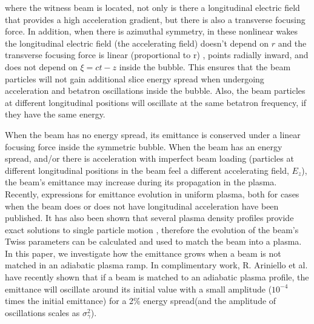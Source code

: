 \documentclass[%
reprint, superscriptaddress,
 amsmath,amssymb, aps,
prstab,
]{revtex4-2}
\begin{document}
where the witness beam is located, not only is there a longitudinal
electric field that provides a high acceleration gradient, but there is also a
transverse focusing force. In addition, when
there is azimuthal symmetry, in these nonlinear wakes the longitudinal electric field (the
accelerating field) doesn't depend on $r$ and the transverse focusing
force is linear (proportional to r) , points radially inward, and does not depend on $\xi = ct- z$ inside the bubble\cite{WeiLu2006}. This ensures
that the beam particles will not gain additional slice energy spread when
undergoing acceleration and betatron oscillations inside the bubble. Also, the beam particles at different
longitudinal positions will oscillate at the same betatron frequency, if
they have the same energy.

When the beam has no energy spread, its emittance is conserved under a
linear focusing force inside the symmetric bubble. When the beam has an energy
spread, %
and/or there is acceleration with imperfect beam loading (particles at different
longitudinal positions in the beam feel a different accelerating field,
$E_z$), the beam's emittance may increase during its propagation in the
plasma. 
Recently, expressions for emittance evolution in uniform plasma, 
both for cases when the beam does \cite{Xinlu2016} or does not have \cite{German2018}
longitudinal acceleration have been published. It has also been shown that several plasma density profiles provide 
exact solutions to single particle motion\cite{Xinlu2016} \cite{German2014} , therefore
the evolution of the beam's Twiss parameters can be calculated and used to match the beam into a plasma.
In this paper,  we investigate how the emittance grows when a beam is not matched in an adiabatic plasma ramp.
In complimentary work, R. Ariniello et al. \cite{Robert} have recently shown that if a beam is matched to an adiabatic plasma profile, the emittance will oscillate around its initial value
with a small amplitude ($10^{-4}$ times the initial emittance) for a 2\% energy spread(and the amplitude of oscillations scales as $\sigma_\gamma^2$). 
\end{document}
